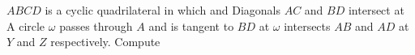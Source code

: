 $ABCD$ is a cyclic quadrilateral in which    and   Diagonals $AC$ and $BD$ intersect at   A circle $\omega$ passes through $A$ and is tangent to $BD$ at  $\omega$ intersects $AB$ and $AD$ at $Y$ and $Z$ respectively.  Compute 